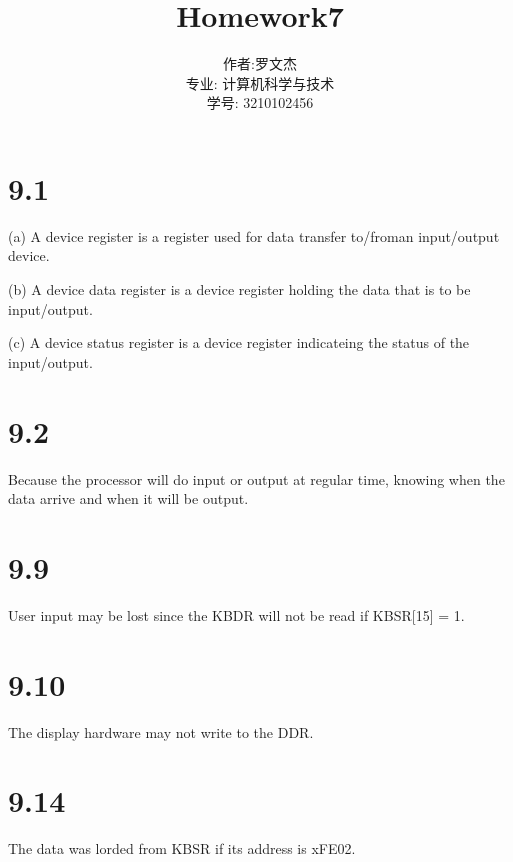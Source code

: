 \documentclass[20pt]{ctexart}
\title{Homework7}
\author{作者:罗文杰\\专业: 计算机科学与技术\\学号: 3210102456}
\date{}
\begin{document}
\maketitle

\section*{9.1}
(a) A device register is a register used for data transfer to/froman input/output device.

(b) A device data register is a device register holding the data that is to be input/output.

(c) A device status register is a device register indicateing the status of the input/output.

\section*{9.2}
Because the processor will do input or output at regular time, knowing when the data arrive and when it will be output. 

\section*{9.9}
User input may be lost since the KBDR will not be read if KBSR[15] = 1.

\section*{9.10}
The display hardware may not write to the DDR.

\section*{9.14}
The data was lorded from KBSR if its address is xFE02.
\end{document}
